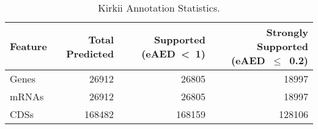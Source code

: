 \begin{table}[ht]
  \begin{center}
    \caption{Kirkii Annotation Statistics.}
    \begin{tabular}{l*{3}{R}}
      \toprule
      Feature & Total Predicted & Supported (eAED~\textless~1) & Strongly Supported (eAED~$\le$~0.2)\cite{Wegrzyn2014} \\
      \midrule
      Genes & 26912  & 26805 & 18997 \\
      mRNAs & 26912  & 26805 & 18997 \\
      CDSs & 168482 &  168159 & 128106 \\
      \bottomrule
    \end{tabular}
  \end{center}
\end{table}
